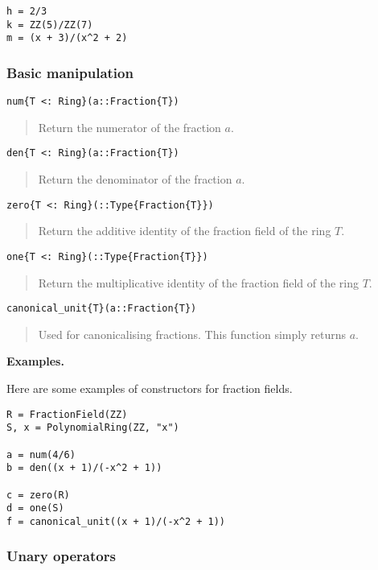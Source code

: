 \documentclass[a4paper,10pt]{article}
\newcommand{\desc}[1]{\vspace{-3mm}\begin{quote}#1\end{quote}}
\begin{document}
{{{\begin{lstlisting}
h = 2/3
k = ZZ(5)/ZZ(7)
m = (x + 3)/(x^2 + 2)
\end{lstlisting}

\subsubsection{Basic manipulation}

\begin{lstlisting}
num{T <: Ring}(a::Fraction{T})
\end{lstlisting}

\desc{Return the numerator of the fraction $a$.}

\begin{lstlisting}
den{T <: Ring}(a::Fraction{T})
\end{lstlisting}

\desc{Return the denominator of the fraction $a$.}

\begin{lstlisting}
zero{T <: Ring}(::Type{Fraction{T}})
\end{lstlisting}

\desc{Return the additive identity of the fraction field of the ring $T$.}

\begin{lstlisting}
one{T <: Ring}(::Type{Fraction{T}})
\end{lstlisting}

\desc{Return the multiplicative identity of the fraction field of the ring 
$T$.}

\begin{lstlisting}
canonical_unit{T}(a::Fraction{T})
\end{lstlisting}

\desc{Used for canonicalising fractions. This function simply returns $a$.}

\textbf{Examples.}

Here are some examples of constructors for fraction fields.

\begin{lstlisting}
R = FractionField(ZZ)
S, x = PolynomialRing(ZZ, "x")

a = num(4/6)
b = den((x + 1)/(-x^2 + 1))

c = zero(R)
d = one(S)
f = canonical_unit((x + 1)/(-x^2 + 1))
\end{lstlisting}

\subsubsection{Unary operators}

}}}
\end{document}
